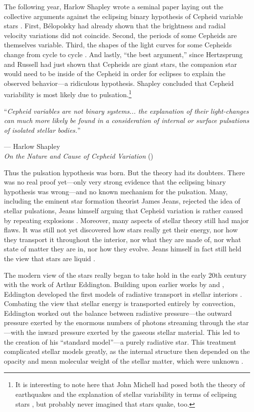 The following year, Harlow Shapley wrote a seminal paper laying out the collective arguments against the eclipsing binary hypothesis of Cepheid variable stars \citep{1914ApJ....40..448S}. 
First, B{\'e}lopolsky had already shown that the brightness and radial velocity variations did not coincide. 
Second, the periods of some Cepheids are themselves variable. %
Third, the shapes of the light curves for some Cepheids change from cycle to cycle \citep[e.g.,][]{1905ApJ....22..274C}. 
And lastly, ``the best argument,'' since Hertzsprung and Russell had just shown that Cepheids are giant stars, the companion star would need to be inside of the Cepheid in order for eclipses to explain the observed behavior---a ridiculous hypothesis. 
Shapley concluded that Cepheid variability is most likely due to pulsation.\footnote{ It is interesting to note here that John Michell had posed both the theory of earthquakes \citep{Michell01011759} and the explanation of stellar variability in terms of eclipsing stars \citep{michell1767inquiry}, but probably never imagined that stars quake, too.}  

\epigraph{``\emph{Cepheid variables are not binary systems... the explanation of their light-changes \hphantom{``}can much more likely be found in a consideration of internal or surface pulsations \hphantom{``}of isolated stellar bodies.}''}{--- Harlow Shapley\\\textit{On the Nature and Cause of Cepheid Variation} (\citeyear{1914ApJ....40..448S})}

Thus the pulsation hypothesis was born. 
But the theory had its doubters. 
There was no real proof yet---only very strong evidence that the eclipsing binary hypothesis was wrong---and no known mechanism for the pulsation. 
Many, including the eminent star formation theorist James Jeans, rejected the idea of stellar pulsations, Jeans himself arguing that Cepheid variation is rather caused by repeating explosions \citep[e.g.,][]{1919Obs....42...88J}. 
Moreover, many aspects of stellar theory still had major flaws. 
It was still not yet discovered how stars really get their energy, nor how they transport it throughout the interior, nor what they are made of, nor what state of matter they are in, nor how they evolve. 
Jeans himself in fact still held the view that stars are liquid \citep[e.g.,][]{1928Natur.121..173J}. 

The modern view of the stars really began to take hold in the early 20th century with the work of Arthur Eddington. 
Building upon earlier works by \citet{Schwarzschild1906} and \citet{1895MmRAS..51..123S}, Eddington developed the first models of radiative transport in stellar interiors \citep[e.g.,][]{1916MNRAS..77...16E}. 
Combating the view that stellar energy is transported entirely by convection, Eddington worked out the balance between radiative pressure---the outward pressure exerted by the enormous numbers of photons streaming through the star---with the inward pressure exerted by the gaseous stellar material. 
This led to the creation of his ``standard model''---a purely radiative star. 
This treatment complicated stellar models greatly, as the internal structure then depended on the opacity and mean molecular weight of the stellar matter, which were unknown \citep[e.g.,][]{ARNY1990211}. 


